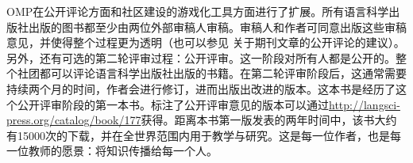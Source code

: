 OMP在公开评论方面和社区建设的游戏化工具方面进行了扩展。所有语言科学出版社出版的图书都至少由两位外部审稿人审稿。审稿人和作者可同意出版这些审稿意见，并使得整个过程更为透明（也可以参见 关于期刊文章的公开评论的建议）。另外，还有可选的第二轮评审过程：公开评审。这一阶段对所有人都是公开的。整个社团都可以评论语言科学出版社出版的书籍。在第二轮评审阶段后，这通常需要持续两个月的时间，作者会进行修订，进而出版出改进的版本。这本书是经历了这个公开评审阶段的第一本书。标注了公开评审意见的版本可以通过\url{http://langsci-press.org/catalog/book/177}获得。距离本书第一版发表的两年时间中，该书大约有15000次的下载，并在全世界范围内用于教学与研究。这是每一位作者，也是每一位教师的愿景：将知识传播给每一个人。

